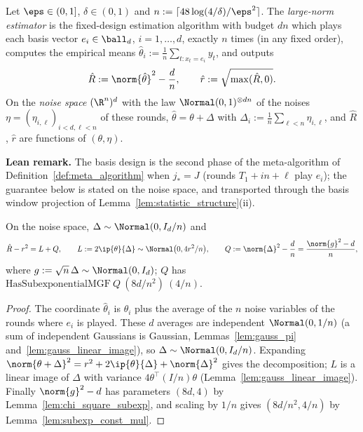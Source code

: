 \begin{definition}\label{def:large_norm_algorithm}
\leanok
{}
Let $\eps \in (0,1]$, $\delta \in (0,1)$ and $n := \lceil 48\log(4/\delta)/\eps^2 \rceil$. The
\emph{large-norm estimator} is the fixed-design estimation algorithm with budget $dn$ which
plays each basis vector $e_i \in \ball_d$, $i = 1,\dots,d$, exactly $n$ times (in any fixed
order), computes the empirical means $\hat\theta_i := \frac1n\sum_{t : x_t = e_i} y_t$, and
outputs
\[
  \hat R := \norm{\hat\theta}^2 - \frac dn, \qquad
  \hat r := \sqrt{\max(\hat R, 0)} .
\]
On the \emph{noise space} $(\R^n)^d$ with the law $\Normal(0,1)^{\otimes dn}$ of the noises
$\eta = (\eta_{i,\ell})_{i<d,\ell<n}$ of these rounds, $\hat\theta = \theta + \Delta$ with
$\Delta_i := \frac1n\sum_{\ell<n}\eta_{i,\ell}$, and $\hat R$, $\hat r$ are functions of
$(\theta, \eta)$.
\end{definition}

\textbf{Lean remark.} The basis design is the second phase of the meta-algorithm of
Definition~\ref{def:meta_algorithm} when $j_* = J$ (rounds $T_1 + in + \ell$ play $e_i$);
the guarantee below is stated on the noise space, and transported through the basis window
projection of Lemma~\ref{lem:statistic_structure}(ii).

\begin{lemma}\label{lem:large_norm_decomposition}
\leanok
{}
On the noise space, $\Delta \sim \Normal(0, I_d/n)$ and
\[
  \hat R - r^2 = L + Q, \qquad
  L := 2\ip{\theta}{\Delta} \sim \Normal\big(0, 4r^2/n\big), \qquad
  Q := \norm{\Delta}^2 - \frac dn = \frac{\norm{g}^2 - d}{n},
\]
where $g := \sqrt n\,\Delta \sim \Normal(0, I_d)$; $Q$ has
$\mathrm{HasSubexponentialMGF}\ Q\ (8d/n^2)\ (4/n)$.
\end{lemma}

\begin{proof}
\leanok
{}
The coordinate $\hat\theta_i$ is $\theta_i$ plus the average of the $n$ noise variables of
the rounds where $e_i$ is played. These $d$ averages are independent
$\Normal(0,1/n)$ (a sum of independent Gaussians is Gaussian,
Lemmas~\ref{lem:gauss_pi} and~\ref{lem:gauss_linear_image}), so
$\Delta \sim \Normal(0, I_d/n)$. Expanding
$\norm{\theta + \Delta}^2 = r^2 + 2\ip{\theta}{\Delta} + \norm{\Delta}^2$ gives the
decomposition; $L$ is a linear image of $\Delta$ with variance $4\theta^\top(I/n)\theta$
(Lemma~\ref{lem:gauss_linear_image}). Finally $\norm{g}^2 - d$ has parameters $(8d, 4)$ by
Lemma~\ref{lem:chi_square_subexp}, and scaling by $1/n$ gives $(8d/n^2, 4/n)$ by
Lemma~\ref{lem:subexp_const_mul}.
\end{proof}

